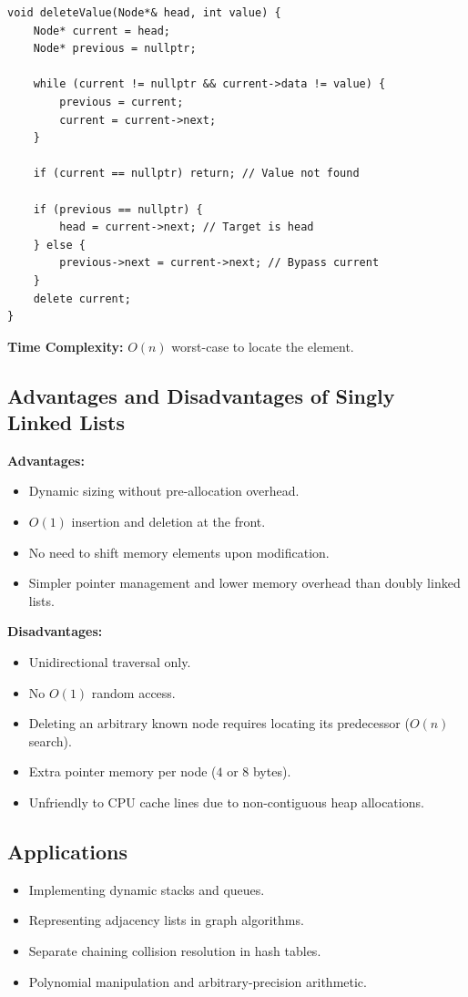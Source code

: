 \begin{lstlisting}[style=cppstyle]
void deleteValue(Node*& head, int value) {
    Node* current = head;
    Node* previous = nullptr;

    while (current != nullptr && current->data != value) {
        previous = current;
        current = current->next;
    }

    if (current == nullptr) return; // Value not found

    if (previous == nullptr) {
        head = current->next; // Target is head
    } else {
        previous->next = current->next; // Bypass current
    }
    delete current;
}
\end{lstlisting}

\textbf{Time Complexity:} $O(n)$ worst-case to locate the element.

\subsection{Advantages and Disadvantages of Singly Linked Lists}

\textbf{Advantages:}
\begin{itemize}
    \item Dynamic sizing without pre-allocation overhead.
    \item $O(1)$ insertion and deletion at the front.
    \item No need to shift memory elements upon modification.
    \item Simpler pointer management and lower memory overhead than doubly linked lists.
\end{itemize}

\textbf{Disadvantages:}
\begin{itemize}
    \item Unidirectional traversal only.
    \item No $O(1)$ random access.
    \item Deleting an arbitrary known node requires locating its predecessor ($O(n)$ search).
    \item Extra pointer memory per node ($4$ or $8$ bytes).
    \item Unfriendly to CPU cache lines due to non-contiguous heap allocations.
\end{itemize}

\subsection{Applications}
\begin{itemize}
    \item Implementing dynamic stacks and queues.
    \item Representing adjacency lists in graph algorithms.
    \item Separate chaining collision resolution in hash tables.
    \item Polynomial manipulation and arbitrary-precision arithmetic.
\end{itemize}

